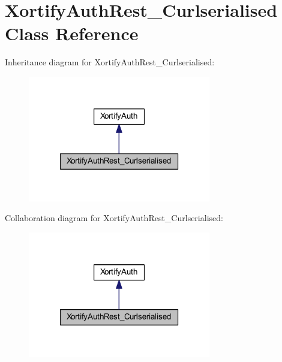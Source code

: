 \hypertarget{class_xortify_auth_rest___curlserialised}{\section{Xortify\-Auth\-Rest\-\_\-\-Curlserialised Class Reference}
\label{class_xortify_auth_rest___curlserialised}
}


Inheritance diagram for Xortify\-Auth\-Rest\-\_\-\-Curlserialised\-:
\nopagebreak
\begin{figure}[H]
\begin{center}
\leavevmode
\includegraphics[width=226pt]{class_xortify_auth_rest___curlserialised__inherit__graph}
\end{center}
\end{figure}


Collaboration diagram for Xortify\-Auth\-Rest\-\_\-\-Curlserialised\-:
\nopagebreak
\begin{figure}[H]
\begin{center}
\leavevmode
\includegraphics[width=226pt]{class_xortify_auth_rest___curlserialised__coll__graph}
\end{center}
\end{figure}
